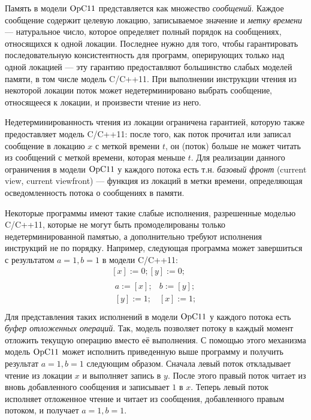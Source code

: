 Память в модели $\mathrm{OpC11}$ представляется как множество \emph{сообщений}. Каждое сообщение содержит целевую локацию, записываемое значение и
\emph{метку времени} --- натуральное число, которое определяет полный порядок на сообщениях, относящихся к одной локации.
Последнее нужно для того, чтобы гарантировать последовательную консистентность для программ, оперирующих только над одной локацией --- эту гарантию
предоставляют большинство слабых моделей памяти, в том числе модель C/C++11.
При выполнении инструкции чтения из некоторой локации поток может недетерминировано выбрать сообщение, относящееся к локации, и произвести
чтение из него.


Недетерминированность чтения из локации ограничена гарантией, которую также предоставляет модель C/C++11:
после того, как поток прочитал или записал сообщение в локацию $x$ с меткой времени $t$, он (поток) больше не может читать из сообщений
с меткой времени, которая меньше $t$. Для реализации данного ограничения в модели $\mathrm{OpC11}$ у каждого потока есть т.н. \emph{базовый фронт}
(current view, current viewfront) --- функция из локаций в метки времени, определяющая осведомленность потока о сообщениях в памяти.

Некоторые программы имеют такие слабые исполнения, разрешенные моделью C/C++11, которые не могут быть промоделированы только недетерминированной
памятью, а дополнительно требуют исполнения инструкций не по порядку. Например, следующая программа может завершиться с
результатом $a = 1, b = 1$ в модели C/C++11:
\[
\begin{array}{c}
[x] := 0; [y] := 0; \\
\begin{array}{l||l}
  {} a := [x]; & b := [y]; \\
  {} [y] := 1; & [x] := 1; \\
\end{array}
\end{array}
\]
Для представления таких исполнений в модели $\mathrm{OpC11}$ у каждого потока есть \emph{буфер отложенных операций}. Так, модель
позволяет потоку в каждый момент отложить текущую операцию вместо её выполнения.
С помощью этого механизма модель $\mathrm{OpC11}$ может исполнить приведенную выше программу и получить результат $a = 1, b = 1$ следующим образом.
Сначала левый поток откладывает чтение из локации $x$ и выполняет запись в $y$. После этого правый поток читает из вновь добавленного
сообщения и записывает $1$ в $x$. Теперь левый поток исполняет отложенное чтение и читает из сообщения, добавленного правым потоком, и получает
$a = 1, b = 1$.

